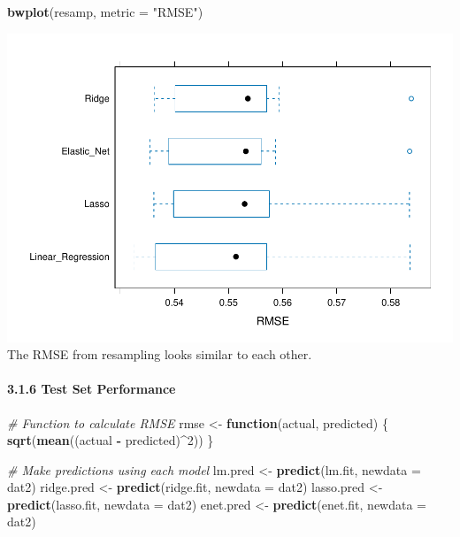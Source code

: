 \documentclass[
]{article}
\newenvironment{Shaded}{\begin{snugshade}}{\end{snugshade}}
\newcommand{\AttributeTok}[1]{\textcolor[rgb]{0.13,0.29,0.53}{#1}}
\newcommand{\CommentTok}[1]{\textcolor[rgb]{0.56,0.35,0.01}{\textit{#1}}}
\newcommand{\ControlFlowTok}[1]{\textcolor[rgb]{0.13,0.29,0.53}{\textbf{#1}}}
\newcommand{\DecValTok}[1]{\textcolor[rgb]{0.00,0.00,0.81}{#1}}
\newcommand{\FunctionTok}[1]{\textcolor[rgb]{0.13,0.29,0.53}{\textbf{#1}}}
\newcommand{\NormalTok}[1]{#1}
\newcommand{\OtherTok}[1]{\textcolor[rgb]{0.56,0.35,0.01}{#1}}
\newcommand{\SpecialCharTok}[1]{\textcolor[rgb]{0.81,0.36,0.00}{\textbf{#1}}}
\newcommand{\StringTok}[1]{\textcolor[rgb]{0.31,0.60,0.02}{#1}}
\begin{document}
\begin{Shaded}
\begin{Highlighting}[]
\FunctionTok{bwplot}\NormalTok{(resamp, }\AttributeTok{metric =} \StringTok{"RMSE"}\NormalTok{)}
\end{Highlighting}
\end{Shaded}

\includegraphics{p8106_midterm_project_files/figure-latex/unnamed-chunk-22-2.pdf}
The RMSE from resampling looks similar to each other.

\paragraph{3.1.6 Test Set Performance}\label{test-set-performance}

\begin{Shaded}
\begin{Highlighting}[]
\CommentTok{\# Function to calculate RMSE}
\NormalTok{rmse }\OtherTok{\textless{}{-}} \ControlFlowTok{function}\NormalTok{(actual, predicted) \{}
  \FunctionTok{sqrt}\NormalTok{(}\FunctionTok{mean}\NormalTok{((actual }\SpecialCharTok{{-}}\NormalTok{ predicted)}\SpecialCharTok{\^{}}\DecValTok{2}\NormalTok{))}
\NormalTok{\}}
\end{Highlighting}
\end{Shaded}

\begin{Shaded}
\begin{Highlighting}[]
\CommentTok{\# Make predictions using each model}
\NormalTok{lm.pred }\OtherTok{\textless{}{-}} \FunctionTok{predict}\NormalTok{(lm.fit, }\AttributeTok{newdata =}\NormalTok{ dat2)}
\NormalTok{ridge.pred }\OtherTok{\textless{}{-}} \FunctionTok{predict}\NormalTok{(ridge.fit, }\AttributeTok{newdata =}\NormalTok{ dat2)}
\NormalTok{lasso.pred }\OtherTok{\textless{}{-}} \FunctionTok{predict}\NormalTok{(lasso.fit, }\AttributeTok{newdata =}\NormalTok{ dat2)}
\NormalTok{enet.pred }\OtherTok{\textless{}{-}} \FunctionTok{predict}\NormalTok{(enet.fit, }\AttributeTok{newdata =}\NormalTok{ dat2)}
\end{Highlighting}
\end{Shaded}
\end{document}
